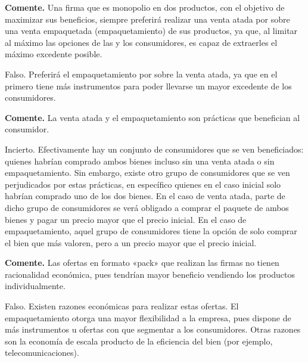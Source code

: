 \question \textbf{Comente.} Una firma que es monopolio en dos productos, con el objetivo de maximizar sus beneficios, siempre preferirá realizar una venta atada por sobre una venta empaquetada (empaquetamiento) de sus productos, ya que, al limitar al máximo las opciones de las y los consumidores, es capaz de extraerles el máximo excedente posible.
\begin{solution}
Falso. Preferirá el empaquetamiento por sobre la venta atada, ya que en el primero tiene más instrumentos para poder llevarse un mayor excedente de los consumidores.

\end{solution}

\question \textbf{Comente.} La venta atada y el empaquetamiento son prácticas que benefician al consumidor.
\begin{solution}
Incierto. Efectivamente hay un conjunto de consumidores que se ven beneficiados: quienes habrían comprado ambos bienes incluso sin una venta atada o sin empaquetamiento. Sin embargo, existe otro grupo de consumidores que se ven perjudicados por estas prácticas, en específico quienes en el caso inicial solo habrían comprado uno de los dos bienes. En el caso de venta atada, parte de dicho grupo de consumidores se verá obligado a comprar el paquete de ambos bienes y pagar un precio mayor que el precio inicial. En el caso de empaquetamiento, aquel grupo de consumidores tiene la opción de solo comprar el bien que más valoren, pero a un precio mayor que el precio inicial.

\end{solution}

\question \textbf{Comente.} Las ofertas en formato «pack» que realizan las firmas no tienen racionalidad económica, pues tendrían mayor beneficio vendiendo los productos individualmente.
\begin{solution}
Falso. Existen razones económicas para realizar estas ofertas. El empaquetamiento otorga una mayor flexibilidad a la empresa, pues dispone de más instrumentos u ofertas con que segmentar a los consumidores. Otras razones son la economía de escala producto de la eficiencia del bien (por ejemplo, telecomunicaciones).

\end{solution}

